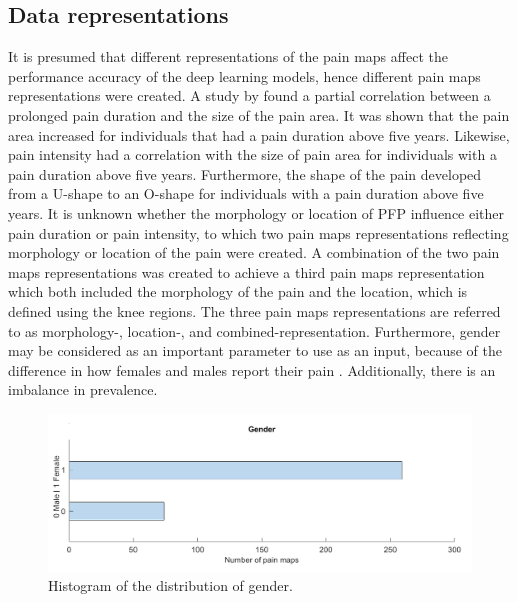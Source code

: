 \subsection{Data representations} \label{sec:representation}
It is presumed that different representations of the pain maps affect the performance accuracy of the deep learning models, hence different pain maps representations were created.
A study by \citeauthor{Boudreau2017} \citep{Boudreau2017} found a partial correlation between a prolonged pain duration and the size of the pain area. It was shown that the pain area increased for individuals that had a pain duration above five years. Likewise, pain intensity had a correlation with the size of pain area for individuals with a pain duration above five years. Furthermore, the shape of the pain developed from a U-shape to an O-shape for individuals with a pain duration above five years.\citep{Boudreau2017} \newline
\noindent
It is unknown whether the morphology or location of PFP influence either pain duration or pain intensity, to which two pain maps representations reflecting morphology or location of the pain were created.
A combination of the two pain maps representations was created to achieve a third pain maps representation which both included the morphology of the pain and the location, which is defined using the knee regions. The three pain maps representations are referred to as morphology-, location-, and combined-representation.
\noindent
Furthermore, gender may be considered as an important parameter to use as an input, because of the difference in how females and males report their pain \citep{Pieh2012}. Additionally, there is an imbalance in prevalence\citep{Rathleff2015}.

\begin{figure} [H]
\centering
\includegraphics[width=1\textwidth]{figures/histoGender}
\caption{Histogram of the distribution of gender.}
\label{fig:histogender}
\end{figure}

